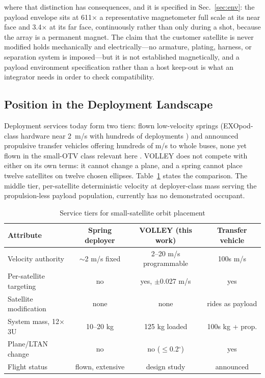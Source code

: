 \documentclass[conference]{IEEEtran}
\begin{document}
where that distinction has consequences, and it is specified in Sec.~\ref{sec:env}: the payload envelope sits at 611$\times$ a representative magnetometer full scale at its near face and 3.4$\times$ at its far face, continuously rather than only during a shot, because the array is a permanent magnet. The claim that the customer satellite is never modified holds mechanically and electrically---no armature, plating, harness, or separation system is imposed---but it is not established magnetically, and a payload environment specification rather than a host keep-out is what an integrator needs in order to check compatibility.

\subsection{Position in the Deployment Landscape}
Deployment services today form two tiers: flown low-velocity springs (EXOpod-class hardware near 2~m/s with hundreds of deployments \cite{exopod}) and announced propulsive transfer vehicles offering hundreds of m/s to whole buses, none yet flown in the small-OTV class relevant here \cite{pushpak}. VOLLEY does not compete with either on its own terms: it cannot change a plane, and a spring cannot place twelve satellites on twelve chosen ellipses. Table~\ref{tab:tier} states the comparison. The middle tier, per-satellite deterministic velocity at deployer-class mass serving the propulsion-less payload population, currently has no demonstrated occupant.

\begin{table}[t]
\caption{Service tiers for small-satellite orbit placement}
\label{tab:tier}
\centering\scriptsize
\begin{tabular}{lccc}
\toprule
Attribute & Spring deployer & VOLLEY (this work) & Transfer vehicle\\
\midrule
Velocity authority & $\sim$2 m/s fixed & 2--20 m/s programmable & 100s m/s\\
Per-satellite targeting & no & yes, $\pm$0.027 m/s & yes\\
Satellite modification & none & none & rides as payload\\
System mass, 12$\times$3U & 10--20 kg & 125 kg loaded & 100s kg + prop.\\
Plane/LTAN change & no & no ($\le$0.2$^\circ$) & yes\\
Flight status & flown, extensive & design study & announced\\
\bottomrule
\end{tabular}
\end{table}
\end{document}
